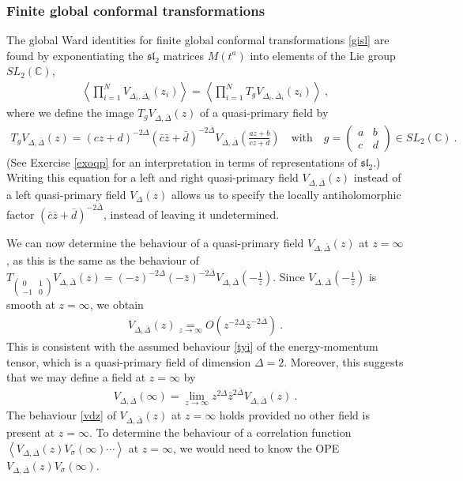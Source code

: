 \documentclass[12pt, a4paper, notitlepage, twoside]{report}
\numberwithin{equation}{section}
\theoremstyle{break}
\begin{document}
\subsubsection{Finite global conformal transformations}

The global Ward identities for 
finite global conformal transformations \eqref{gisl} are found by exponentiating the $\mathfrak{sl}_2$ matrices $M(t^a)$ into elements of the Lie group $SL_2({\mathbb{C}})$,
\begin{align}
\left\langle \prod_{i=1}^N V_{\Delta_i,\bar\Delta_i}(z_i)\right\rangle  = \left\langle \prod_{i=1}^N T_g V_{\Delta_i,\bar\Delta_i}(z_i) \right\rangle \ , 
\label{vtv}
\end{align}
where we define the image $T_gV_{\Delta,\bar\Delta}(z)$ of a quasi-primary field by
\begin{align}
 \boxed{T_g V_{\Delta,\bar\Delta}(z) = (cz+d)^{-2\Delta} (\bar c\bar z+\bar d)^{-2\bar\Delta}V_{\Delta,\bar\Delta}\left(\frac{az+b}{cz+d}\right)} \quad \text{with} \quad g = \left(\begin{smallmatrix} a & b \\ c & d \end{smallmatrix}\right) \in SL_2({\mathbb{C}})\ .
\label{tgv}
\end{align}
(See Exercise \ref{exoqp} for an interpretation in terms of representations of $\mathfrak{sl}_2$.) Writing this equation for a left and right quasi-primary field $V_{\Delta,\bar\Delta}(z)$ instead of a left quasi-primary field $V_\Delta(z)$ allows us to specify the locally antiholomorphic factor $(\bar c\bar z+\bar d)^{-2\bar\Delta}$, instead of leaving it undetermined.

We can now determine the behaviour of a quasi-primary field $V_{\Delta,\bar\Delta}(z)$ at $z=\infty$, as this is the same as the behaviour of $T_{\left(\begin{smallmatrix} 0 & 1 \\ -1 & 0 \end{smallmatrix}\right)}V_{\Delta,\bar\Delta}(z)= (-z)^{-2\Delta}(-\bar z)^{-2\bar\Delta}V_{\Delta,\bar\Delta}(-\frac{1}{z})$.
Since $V_{\Delta,\bar\Delta}(-\frac{1}{z})$ is smooth at $z=\infty$, we obtain
\begin{align}
 \boxed{V_{\Delta,\bar\Delta}(z) \underset{z\to \infty}{=} O\left(z^{-2\Delta}\bar z^{-2\bar\Delta}\right)}\ .
\label{vdz}
\end{align}
This is consistent with the assumed behaviour \eqref{tyi} of the energy-momentum tensor, which is a quasi-primary field of dimension $\Delta=2$.
Moreover, this suggests that we may define a field at $z=\infty$ by 
\begin{align}
 V_{\Delta,\bar\Delta}(\infty) = \underset{z\to \infty}{\lim} z^{2\Delta}\bar z^{2\bar\Delta} V_{\Delta,\bar\Delta}(z)\ . 
\end{align}
The behaviour \eqref{vdz} of $V_{\Delta,\bar\Delta}(z)$ at $z=\infty$ holds provided no other field is present at $z=\infty$.
To determine the behaviour of a correlation function $\left\langle V_{\Delta,\bar\Delta}(z) V_\sigma(\infty)\cdots \right\rangle$ at $z=\infty$, we would need to know the OPE $V_{\Delta,\bar\Delta}(z) V_{\sigma}(\infty)$.
\end{document}
